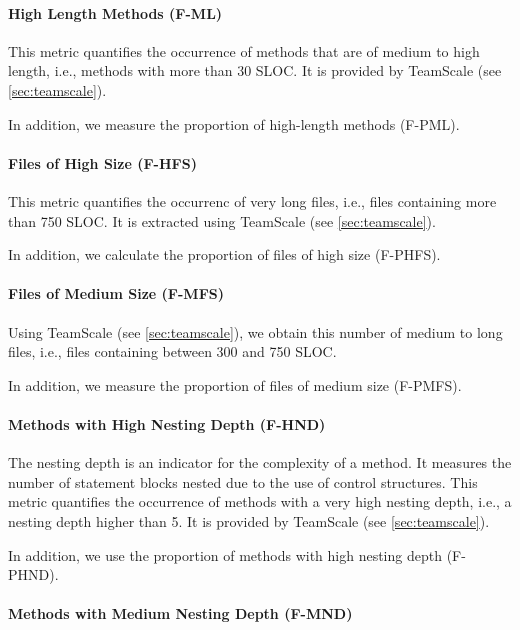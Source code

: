 \documentclass{scrartcl}
\begin{document}
\paragraph{High Length Methods (F-ML)}

This metric quantifies the occurrence of methods that are of medium to high
length, i.e., methods with more than 30 SLOC. It is provided by TeamScale (see
\ref{sec:teamscale}).

In addition, we measure the proportion of high-length methods (F-PML).

\paragraph{Files of High Size (F-HFS)}

This metric quantifies the occurrenc of very long files, i.e., files containing
more than 750 SLOC. It is extracted using TeamScale (see \ref{sec:teamscale}).

In addition, we calculate the proportion of files of high size (F-PHFS).

\paragraph{Files of Medium Size (F-MFS)}

Using TeamScale (see \ref{sec:teamscale}), we obtain this number of medium to
long files, i.e., files containing between 300 and 750 SLOC.

In addition, we measure the proportion of files of medium size (F-PMFS).

\paragraph{Methods with High Nesting Depth (F-HND)}

The nesting depth is an indicator for the complexity of a method. It measures
the number of statement blocks nested due to the use of control structures. This
metric quantifies the occurrence of methods with a very high nesting depth,
i.e., a nesting depth higher than 5. It is provided by TeamScale (see
\ref{sec:teamscale}).

In addition, we use the proportion of methods with high nesting depth (F-PHND).

\paragraph{Methods with Medium Nesting Depth (F-MND)}
\end{document}
